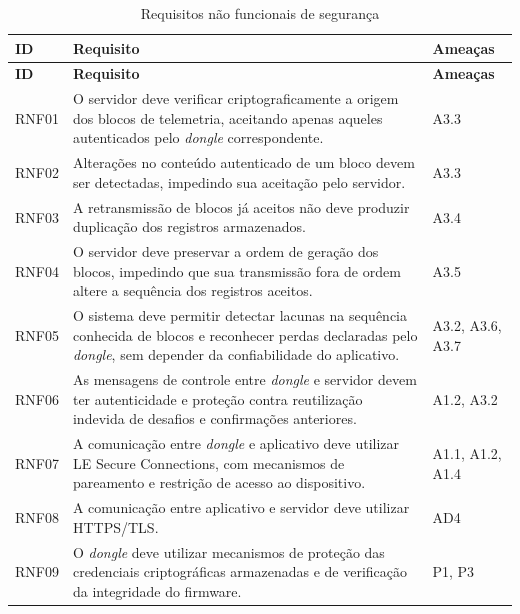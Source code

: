 \begin{longtable}{
    p{}
    p{}
    p{}
}
\caption{Requisitos não funcionais de segurança}
\label{tab:rnf-seguranca}\\
\hline
\textbf{ID} & \textbf{Requisito} & \textbf{Ameaças} \\
\hline
\endfirsthead

\hline
\textbf{ID} & \textbf{Requisito} & \textbf{Ameaças} \\
\hline
\endhead

RNF01 & O servidor deve verificar criptograficamente a origem
dos blocos de telemetria, aceitando apenas aqueles autenticados
pelo \textit{dongle} correspondente. & A3.3 \\

RNF02 & Alterações no conteúdo autenticado de um bloco devem
ser detectadas, impedindo sua aceitação pelo servidor.
& A3.3 \\

RNF03 & A retransmissão de blocos já aceitos não deve produzir
duplicação dos registros armazenados. & A3.4 \\

RNF04 & O servidor deve preservar a ordem de geração dos
blocos, impedindo que sua transmissão fora de ordem altere
a sequência dos registros aceitos. & A3.5 \\

RNF05 & O sistema deve permitir detectar lacunas na sequência
conhecida de blocos e reconhecer perdas declaradas pelo \textit{dongle},
sem depender da confiabilidade do aplicativo.
& A3.2, A3.6, A3.7 \\

RNF06 & As mensagens de controle entre \textit{dongle} e servidor
devem ter autenticidade e proteção contra reutilização
indevida de desafios e confirmações anteriores.
& A1.2, A3.2 \\

RNF07 & A comunicação entre \textit{dongle} e aplicativo deve utilizar
LE Secure Connections, com mecanismos de pareamento
e restrição de acesso ao dispositivo.
& A1.1, A1.2, A1.4 \\

RNF08 & A comunicação entre aplicativo e servidor deve
utilizar HTTPS/TLS.
& AD4 \\

RNF09 & O \textit{dongle} deve utilizar mecanismos de proteção das
credenciais criptográficas armazenadas e de verificação
da integridade do firmware.
& P1, P3 \\

\hline
\end{longtable}


